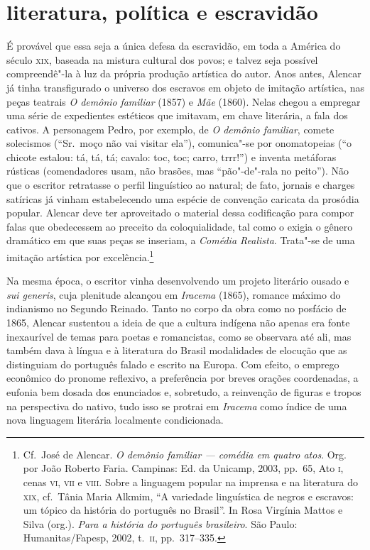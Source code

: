 \section{literatura, política e escravidão}
É provável que essa seja a única defesa da escravidão, em toda a América
do século \textsc{xix}, baseada na mistura cultural dos povos; e talvez seja
possível compreendê"-la à  luz da própria produção artística do autor.
Anos antes, Alencar já tinha transfigurado o universo dos escravos em
objeto de imitação artística, nas peças teatrais \textit{O demônio}
\textit{familiar} (1857) e \textit{Mãe} (1860). Nelas chegou a empregar
uma série de expedientes estéticos que imitavam, em chave literária, a
fala dos cativos. A personagem Pedro, por exemplo, de \textit{O demônio
familiar}, comete solecismos (``Sr.~moço não vai visitar ela''),
comunica"-se por onomatopeias (``o chicote estalou: tá, tá, tá; cavalo:
toc, toc; carro, trrr!'') e inventa metáforas rústicas (comendadores
usam, não brasões, mas ``pão"-de"-rala no peito''). Não que o escritor
retratasse o perfil linguístico ao natural; de fato, jornais e charges
satíricas já vinham estabelecendo uma espécie de convenção caricata da
prosódia popular. Alencar deve ter aproveitado o material dessa
codificação para compor falas que obedecessem ao preceito da
coloquialidade, tal como o exigia o gênero dramático em que suas peças
se inseriam, a \textit{Comédia Realista}. Trata"-se de uma imitação
artística por excelência.\footnote{ Cf.~José de Alencar. \textit{O
demônio familiar --- comédia em quatro atos}. Org. por João Roberto
Faria. Campinas: Ed. da Unicamp, 2003, pp.~65, Ato \textsc{i}, cenas \textsc{vi}, \textsc{vii}
e \textsc{viii}. Sobre a linguagem popular na imprensa e na literatura do \textsc{xix},
cf.~Tânia Maria Alkmim, ``A variedade linguística de negros e escravos:
um tópico da história do português no Brasil''. In Rosa Virgínia Mattos
e Silva (org.). \textit{Para a história do português brasileiro}. São
Paulo: Humanitas/Fapesp, 2002, t.~\textsc{ii}, pp.~317--335.}  

Na mesma época, o escritor vinha desenvolvendo um projeto literário
ousado e \textit{sui generis}, cuja plenitude alcançou em
\textit{Iracema} (1865), romance máximo do indianismo no Segundo
Reinado. Tanto no corpo da obra como no posfácio de 1865, Alencar
sustentou a ideia de que a cultura indígena não apenas era fonte inexaurível
de temas para poetas e romancistas, como se observara até ali, mas também dava à  língua 
e à  literatura do Brasil modalidades de elocução que as distinguiam do português falado 
e escrito na Europa. Com efeito, o emprego econômico do pronome reflexivo, a preferência por breves 
orações coordenadas, a eufonia bem dosada dos enunciados e, sobretudo, a reinvenção de 
figuras e tropos na perspectiva do nativo, tudo isso se protrai em \textit{Iracema} como índice
de uma nova linguagem literária localmente condicionada.  

